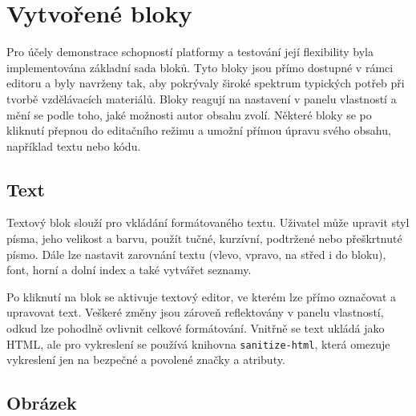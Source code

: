 


\section{Vytvořené bloky}\label{text:realizace/vytvoreneBloky}

Pro účely demonstrace schopností platformy a testování její flexibility byla implementována základní sada bloků.
Tyto bloky jsou přímo dostupné v rámci editoru a byly navrženy tak, aby pokrývaly široké spektrum typických potřeb při tvorbě vzdělávacích materiálů. 
Bloky reagují na nastavení v panelu vlastností a mění se podle toho, jaké možnosti autor obsahu zvolí. 
Některé bloky se po kliknutí přepnou do editačního režimu a umožní přímou úpravu svého obsahu, například textu nebo kódu. 

\subsection{Text}

Textový blok slouží pro vkládání formátovaného textu. 
Uživatel může upravit styl písma, jeho velikost a barvu, použít tučné, kurzívní, podtržené nebo přeškrtnuté písmo. 
Dále lze nastavit zarovnání textu (vlevo, vpravo, na střed i do bloku), font, horní a dolní index a také vytvářet seznamy. 

Po kliknutí na blok se aktivuje textový editor, ve kterém lze přímo označovat a upravovat text. 
Veškeré změny jsou zároveň reflektovány v panelu vlastností, odkud lze pohodlně ovlivnit celkové formátování. 
Vnitřně se text ukládá jako HTML, ale pro vykreslení se používá knihovna \texttt{sanitize-html}, která omezuje vykreslení jen na bezpečné a povolené značky a atributy.

\subsection{Obrázek}

